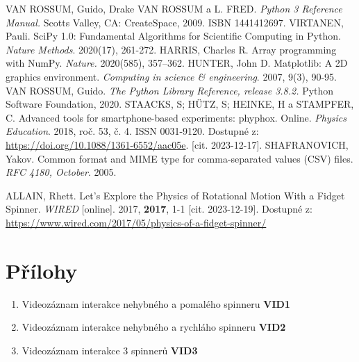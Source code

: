 \documentclass[12pt, a4paper,
 twoside,        %
 openright
]{report}
\begin{document}
\begin{thebibliography}{99}
     VAN ROSSUM, Guido, Drake VAN ROSSUM a L. FRED. \textit{Python 3 Reference Manual.} Scotts Valley, CA: CreateSpace, 2009. ISBN 1441412697.
     VIRTANEN, Pauli. SciPy 1.0: Fundamental Algorithms for Scientific Computing in Python. \textit{Nature Methods}. 2020(17), 261-272.
     HARRIS, Charles R. Array programming with NumPy. \textit{Nature.} 2020(585), 357–362.
     HUNTER, John D. Matplotlib: A 2D graphics environment. \textit{Computing in science \& engineering}. 2007, 9(3), 90-95.
     VAN ROSSUM, Guido. \textit{The Python Library Reference, release 3.8.2.} Python Software Foundation, 2020.
     STAACKS, S; HÜTZ, S; HEINKE, H a STAMPFER, C. Advanced tools for smartphone-based experiments: phyphox. Online. \textit{Physics Education}. 2018, roč. 53, č. 4. ISSN 0031-9120. Dostupné z: \url{https://doi.org/10.1088/1361-6552/aac05e}. [cit. 2023-12-17].
     SHAFRANOVICH, Yakov. Common format and MIME type for comma-separated values (CSV) files. \textit{RFC 4180, October}. 2005.

     ALLAIN, Rhett. Let’s Explore the Physics of Rotational Motion With a Fidget Spinner. \textit{WIRED} [online]. 2017, \textbf{2017}, 1-1 [cit. 2023-12-19]. Dostupné z: \url{https://www.wired.com/2017/05/physics-of-a-fidget-spinner/}
\end{thebibliography}

\listoffigures

\listoftables

\lstlistoflistings

\chapter*{Přílohy}
\begin{enumerate}[topsep=0pt, partopsep=0pt]
    \setlength{\itemsep}{0pt}%
    \setlength{\parskip}{0pt}%
    \item \label{attachment_1} Videozáznam interakce nehybného a pomalého spinneru \dotfill \textbf{VID1}
    \item \label{attachment_2} Videozáznam interakce nehybného a rychláho spinneru \dotfill \textbf{VID2}
    \item \label{attachment_3} Videozáznam interakce 3 spinnerů \dotfill \textbf{VID3}
\end{enumerate}
\end{document}
